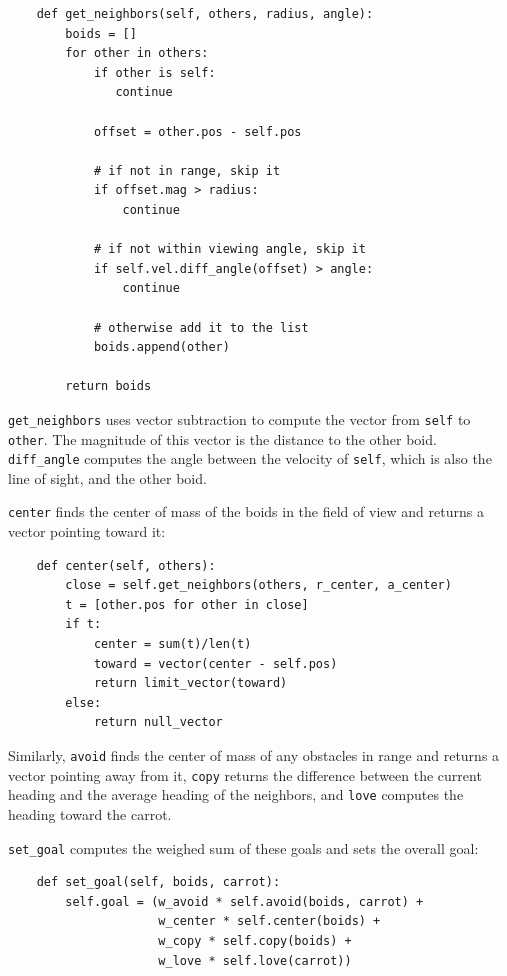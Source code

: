 \documentclass[10pt]{book}
\begin{document}
\begin{verbatim}
    def get_neighbors(self, others, radius, angle):
        boids = []
        for other in others:
            if other is self:
               continue

            offset = other.pos - self.pos

            # if not in range, skip it
            if offset.mag > radius:
                continue

            # if not within viewing angle, skip it
            if self.vel.diff_angle(offset) > angle:
                continue

            # otherwise add it to the list
            boids.append(other)

        return boids
\end{verbatim}

\verb"get_neighbors" uses vector subtraction to compute the
vector from {\tt self} to {\tt other}.  The magnitude of
this vector is the distance to the other boid.  \verb"diff_angle"
computes the angle between the velocity of {\tt self}, which
is also the line of sight, and the other boid.

{\tt center} finds the center of mass of the boids in the
field of view and returns a vector pointing toward it:

\begin{verbatim}
    def center(self, others):
        close = self.get_neighbors(others, r_center, a_center)
        t = [other.pos for other in close]
        if t:
            center = sum(t)/len(t)
            toward = vector(center - self.pos)
            return limit_vector(toward)
        else:
            return null_vector
\end{verbatim}

Similarly, {\tt avoid} finds the center of mass of any obstacles
in range and returns a vector pointing away from it,
{\tt copy} returns the difference between the current heading
and the average heading of the neighbors, and {\tt love}
computes the heading toward the carrot.

\verb"set_goal" computes the weighed sum of these goals and
sets the overall goal:

\begin{verbatim}
    def set_goal(self, boids, carrot):
        self.goal = (w_avoid * self.avoid(boids, carrot) +
                     w_center * self.center(boids) +
                     w_copy * self.copy(boids) +
                     w_love * self.love(carrot))
\end{verbatim}
\end{document}
